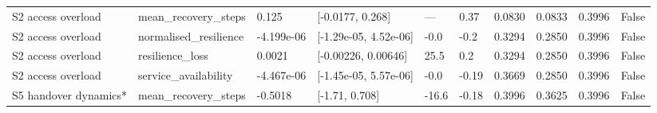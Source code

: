 \begin{tabular}{llllllllll}
S2 access overload & mean\_recovery\_steps & 0.125 & [-0.0177, 0.268] & — & 0.37 & 0.0830 & 0.0833 & 0.3996 & False \\
S2 access overload & normalised\_resilience & -4.199e-06 & [-1.29e-05, 4.52e-06] & -0.0 & -0.2 & 0.3294 & 0.2850 & 0.3996 & False \\
S2 access overload & resilience\_loss & 0.0021 & [-0.00226, 0.00646] & 25.5 & 0.2 & 0.3294 & 0.2850 & 0.3996 & False \\
S2 access overload & service\_availability & -4.467e-06 & [-1.45e-05, 5.57e-06] & -0.0 & -0.19 & 0.3669 & 0.2850 & 0.3996 & False \\
S5 handover dynamics* & mean\_recovery\_steps & -0.5018 & [-1.71, 0.708] & -16.6 & -0.18 & 0.3996 & 0.3625 & 0.3996 & False \\
\bottomrule
\end{tabular}
